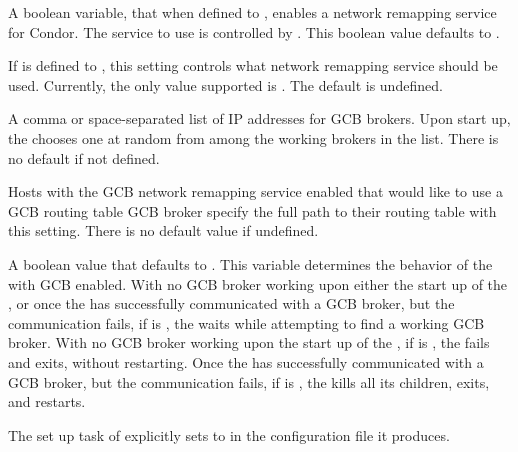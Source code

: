 \begin{description}

\label{param:NetRemapEnable}
\item[\Macro{NET\_REMAP\_ENABLE}] 
  A boolean variable, that when defined to , enables a network 
  remapping service for Condor.
  The service to use is controlled by .
  This boolean value defaults to .

\label{param:NetRemapService}
\item[\Macro{NET\_REMAP\_SERVICE}]
  If  is
  defined to , this setting controls what network remapping
  service should be used.
  Currently, the only value supported is \verb@GCB@.
  The default is undefined.

\label{param:NetRemapInagent}
\item[\Macro{NET\_REMAP\_INAGENT}]
  A comma or space-separated list of IP addresses for GCB brokers.
  Upon start up, the  chooses one at random from
  among the working brokers in the list.
  There is no default if not defined.

\label{param:NetRemapRoute}
\item[\Macro{NET\_REMAP\_ROUTE}]
  Hosts with the GCB network remapping service enabled that would like
  to use a GCB routing table 
  GCB broker specify
  the full path to their routing table with this setting.
  There is no default value if undefined.

\label{param:MasterWaitsForGCBBroker}
\item[\Macro{MASTER\_WAITS\_FOR\_GCB\_BROKER}]
  A boolean value that defaults to .
  This variable determines the behavior of the 
  with GCB enabled.
  With no GCB broker working upon either the start up of the , 
  or once the  has successfully communicated with a
  GCB broker, but the communication fails,
  if  is ,
  the  waits while attempting to find a
  working GCB broker.
  With no GCB broker working upon the start up of the , 
  if  is ,
  the  fails and exits, without restarting.
  Once the  has successfully communicated with a
  GCB broker, but the communication fails,
  if  is ,
  the  kills all its children, exits, and restarts.

  The set up task of  explicitly sets
   to  in the
  configuration file it produces.

\end{description}

